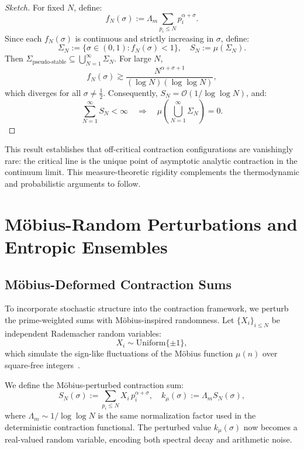 \documentclass[12pt]{article}
\begin{document}
\begin{proof}[Sketch]
For fixed $N$, define:
\[
f_N(\sigma) := \Lambda_m \sum_{p_i \le N} p_i^{\alpha + \sigma}.
\]
Since each $f_N(\sigma)$ is continuous and strictly increasing in $\sigma$, define:
\[
\Sigma_N := \{ \sigma \in (0,1) : f_N(\sigma) < 1 \}, \quad S_N := \mu(\Sigma_N).
\]
Then $\Sigma_{\text{pseudo-stable}} \subseteq \bigcup_{N=1}^\infty \Sigma_N$. For large $N$,
\[
f_N(\sigma) \gtrsim \frac{N^{\alpha + \sigma + 1}}{(\log N)(\log \log N)},
\]
which diverges for all $\sigma \ne \tfrac{1}{2}$. Consequently, $S_N = \mathcal{O}(1 / \log \log N)$, and:
\[
\sum_{N=1}^\infty S_N < \infty \quad \Rightarrow \quad \mu\left( \bigcup_{N=1}^\infty \Sigma_N \right) = 0.
\]
\end{proof}

\noindent This result establishes that off-critical contraction configurations are vanishingly rare: the critical line is the unique point of asymptotic analytic contraction in the continuum limit. This measure-theoretic rigidity complements the thermodynamic and probabilistic arguments to follow.





\section{Möbius-Random Perturbations and Entropic Ensembles}

\subsection{Möbius-Deformed Contraction Sums}

To incorporate stochastic structure into the contraction framework, we perturb the prime-weighted sums with Möbius-inspired randomness. Let $\{X_i\}_{i \le N}$ be independent Rademacher random variables:
\[
X_i \sim \text{Uniform}\{\pm 1\},
\]
which simulate the sign-like fluctuations of the Möbius function $\mu(n)$ over square-free integers~\cite{montgomery1971topics, billingsley1995probability}.

We define the Möbius-perturbed contraction sum:
\[
S_N(\sigma) := \sum_{p_i \le N} X_i \, p_i^{\alpha + \sigma}, \quad k_\mu(\sigma) := \Lambda_m S_N(\sigma),
\]
where $\Lambda_m \sim 1/\log \log N$ is the same normalization factor used in the deterministic contraction functional. The perturbed value $k_\mu(\sigma)$ now becomes a real-valued random variable, encoding both spectral decay and arithmetic noise.
\end{document}
